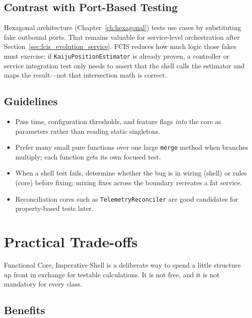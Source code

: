 \subsection{Contrast with Port-Based Testing}
\label{sec:fcis_testing_vs_ports}

Hexagonal architecture (Chapter~\ref{ch:hexagonal}) tests use cases by substituting fake outbound ports. That remains valuable for service-level orchestration after Section~\ref{sec:fcis_evolution_service}. FCIS reduces how much logic those fakes must exercise: if \texttt{KaijuPositionEstimator} is already proven, a controller or service integration test only needs to assert that the shell calls the estimator and maps the result---not that intersection math is correct.

\subsection{Guidelines}
\label{sec:fcis_testing_guidelines}

\begin{itemize}
    \item Pass time, configuration thresholds, and feature flags \textit{into} the core as parameters rather than reading static singletons.
    \item Prefer many small pure functions over one large \texttt{merge} method when branches multiply; each function gets its own focused test.
    \item When a shell test fails, determine whether the bug is in wiring (shell) or rules (core) before fixing; mixing fixes across the boundary recreates a fat service.
    \item Reconciliation cores such as \texttt{TelemetryReconciler} are good candidates for property-based tests later.
\end{itemize}

\section{Practical Trade-offs}
\label{sec:fcis_tradeoffs}

Functional Core, Imperative Shell is a deliberate way to spend a little structure up front in exchange for testable calculations. It is not free, and it is not mandatory for every class.

\subsection{Benefits}
\label{sec:fcis_pros}

